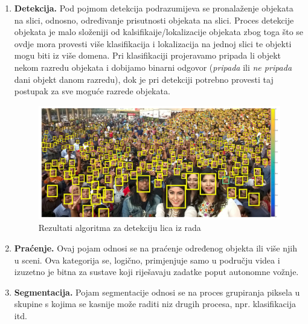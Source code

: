 \begin{enumerate}
\item \textbf{Detekcija.} Pod pojmom detekcija podrazumijeva se pronalaženje objekata na slici, odnosno, određivanje prisutnosti objekata na slici. Proces detekcije objekata je malo složeniji od kalsifikaije/lokalizacije objekata zbog toga što se ovdje mora provesti više klasifikacija i lokalizacija na jednoj slici te objekti mogu biti iz više domena. Pri klasifikaciji projeravamo pripada li objekt nekom razredu objekata i dobijamo binarni odgovor (\textit{pripada} ili \textit{ne pripada} dani objekt danom razredu), dok je pri detekciji potrebno provesti taj postupak za sve moguće razrede objekata.
\begin{figure}[htb]
\centering
\includegraphics[width=\linewidth]{img/FindingTinyFaces.png}
\caption{Rezultati algoritma za detekciju lica iz rada \citep{TinyFaceDetector}}
\label{img:findingTinyFaces}
\end{figure}

\item \textbf{Praćenje.} Ovaj pojam odnosi se na praćenje određenog objekta ili više njih u sceni. Ova kategorija se, logično, primjenjuje samo u području videa i izuzetno je bitna za sustave koji riješavaju zadatke poput autonomne vožnje.

\item \textbf{Segmentacija.} Pojam segmentacije odnosi se na proces grupiranja piksela u skupine s kojima se kasnije može raditi niz drugih procesa, npr. klasifikacija itd. 


\end{enumerate}
